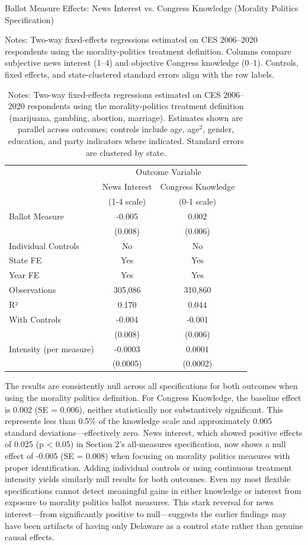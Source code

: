 \documentclass[12pt,letterpaper,oneside]{book}
\begin{document}
\begin{table}[H]
\centering
\caption{Ballot Measure Effects: News Interest vs. Congress Knowledge (Morality Politics Specification)}
\label{tab:knowledge_comparison}
\caption*{\footnotesize Notes: Two-way fixed-effects regressions estimated on CES 2006--2020 respondents using the morality-politics treatment definition. Columns compare subjective news interest (1--4) and objective Congress knowledge (0--1). Controls, fixed effects, and state-clustered standard errors align with the row labels.}
\begin{tabular}{lccc}
\hline\hline
& \multicolumn{2}{c}{Outcome Variable} \\
\cline{2-3}
& News Interest & Congress Knowledge \\
& (1-4 scale) & (0-1 scale) \\
\hline
Ballot Measure & -0.005 & 0.002 \\
& (0.008) & (0.006) \\
\hline
Individual Controls & No & No \\
State FE & Yes & Yes \\
Year FE & Yes & Yes \\
Observations & 305,086 & 310,860 \\
R² & 0.170 & 0.044 \\
\hline
With Controls & -0.004 & -0.001 \\
& (0.008) & (0.006) \\
\hline
Intensity (per measure) & -0.0003 & 0.0001 \\
& (0.0005) & (0.0002) \\
\hline\hline
\end{tabular}
\caption*{\footnotesize Notes: Two-way fixed-effects regressions estimated on CES 2006--2020 respondents using the morality-politics treatment definition (marijuana, gambling, abortion, marriage). Estimates shown are parallel across outcomes; controls include age, age$^2$, gender, education, and party indicators where indicated. Standard errors are clustered by state.}
\end{table}

The results are consistently null across all specifications for both outcomes when using the morality politics definition. For Congress Knowledge, the baseline effect is 0.002 (SE = 0.006), neither statistically nor substantively significant. This represents less than 0.5\% of the knowledge scale and approximately 0.005 standard deviations—effectively zero. News interest, which showed positive effects of 0.025 (p < 0.05) in Section 2's all-measures specification, now shows a null effect of -0.005 (SE = 0.008) when focusing on morality politics measures with proper identification. Adding individual controls or using continuous treatment intensity yields similarly null results for both outcomes. Even my most flexible specifications cannot detect meaningful gains in either knowledge or interest from exposure to morality politics ballot measures. This stark reversal for news interest—from significantly positive to null—suggests the earlier findings may have been artifacts of having only Delaware as a control state rather than genuine causal effects.
\end{document}
